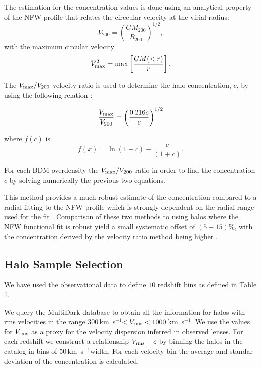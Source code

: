 \documentclass{article}
\newcommand{\kms}{\,km~s$^{-1}$}
\begin{document}
The estimation for the concentration values is done using an
analytical property of the NFW profile that relates the circcular
velocity at the virial radius:
\begin{equation}
V_{200} = \left(\frac{GM_{200}}{R_{200}}\right)^{1/2},
\end{equation}
with the maximum circular velocity 
\begin{equation}
V_{\rm max}^{2} = {\rm max}\left[\frac{GM(<r)}{r}\right].
\end{equation}


The $V_{\rm max}/V_{200}$ velocity ratio is used to determine the halo
concentration, $c$, by using the following relation \citep{Bolshoi}:

\begin{equation}
\frac{V_{\rm max}}{V_{200}} = \left(\frac{0.216 c}{c}\right)^{1/2}
\end{equation}

where $f(c)$ is
\begin{equation}
f(x) = \ln(1+c) - \frac{c}{(1+c)}.
\end{equation}

For each BDM overdensity the $V_{\rm max}/V_{200}$ ratio in order to
find the concentration $c$ by solving numerically the previous two
equations. 

This method provides a much robust estimate of the concentration
compared to a radial fitting to the NFW profile which is strongly
dependent on the radial range used for the fit
\citep{Bolshoi,Meneghetti13}. Comparison of these two methods to
using halos where the NFW functional fit is robust yield a small
systematic offset of $(5-15)\%$, with the concentration  derived by
the velocity ratio method being higher \citep{Prada12}. 

\subsection{Halo Sample Selection}

We have used the observational data to define $10$ redshift bins
as defined in Table 1.

We query the MultiDark database to obtain all the information for
halos with rms velocities in the range $300$\kms$<V_{\rm
  rms}<1000$\kms. We use the values for $V_{\rm rms}$ as a proxy for
the velocity dispersion inferred in observed lenses. For each redshift
we construct a relationship $V_{\rm rms}-c$ by binning the halos in
the catalog in bins of $50$\kms width. For each velocity bin the
average and standar deviation of the concentration is calculated. 
\end{document}
